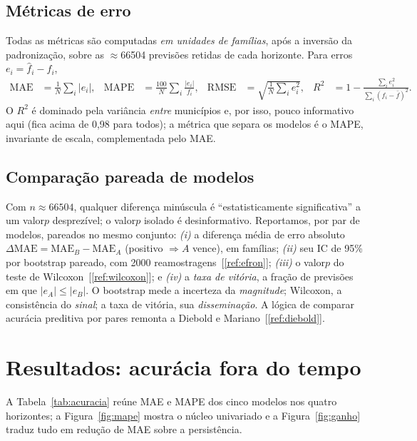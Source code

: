 \documentclass[12pt,a4paper,oneside]{article}
\newcommand{\C}[1]{[\ref{#1}]}
\begin{document}
\subsection{Métricas de erro}

Todas as métricas são computadas \emph{em unidades de famílias}, após a
inversão da padronização, sobre as $\approx$\num{66504} previsões retidas de
cada horizonte. Para erros $e_i=\widehat{f}_i-f_i$,
\begin{align}
\mathrm{MAE}  &= \frac{1}{N}\sum_{i}\lvert e_i\rvert, &
\mathrm{MAPE} &= \frac{100}{N}\sum_{i}\frac{\lvert e_i\rvert}{f_i}, &
\mathrm{RMSE} &= \sqrt{\frac{1}{N}\sum_{i}e_i^2}, &
R^2 &= 1-\frac{\sum_i e_i^2}{\sum_i (f_i-\bar f)^2}.
\end{align}
O $R^2$ é dominado pela variância \emph{entre} municípios e, por isso,
pouco informativo aqui (fica acima de 0,98 para todos); a métrica que
separa os modelos é o MAPE, invariante de escala, complementada pelo MAE.

\subsection{Comparação pareada de modelos}

Com $n\approx\num{66504}$, qualquer diferença minúscula é
``estatisticamente significativa'' a um valor\-$p$ desprezível; o
valor\-$p$ isolado é desinformativo. Reportamos, por par de modelos,
pareados no mesmo conjunto: \emph{(i)} a diferença média de erro absoluto
$\Delta\mathrm{MAE}=\mathrm{MAE}_B-\mathrm{MAE}_A$ (positivo $\Rightarrow A$
vence), em famílias; \emph{(ii)} seu IC de 95\% por bootstrap pareado, com
\num{2000} reamostragens~\C{ref:efron}; \emph{(iii)} o valor\-$p$ do teste
de Wilcoxon~\C{ref:wilcoxon}; e \emph{(iv)} a \emph{taxa de vitória}, a
fração de previsões em que $\lvert e_A\rvert\le\lvert e_B\rvert$. O
bootstrap mede a incerteza da \emph{magnitude}; Wilcoxon, a consistência do
\emph{sinal}; a taxa de vitória, sua \emph{disseminação}. A lógica de
comparar acurácia preditiva por pares remonta a Diebold e
Mariano~\C{ref:diebold}.

\section{Resultados: acurácia fora do tempo}
\label{sec:resultados}

A Tabela~\ref{tab:acuracia} reúne MAE e MAPE dos cinco modelos nos quatro
horizontes; a Figura~\ref{fig:mape} mostra o núcleo univariado e a
Figura~\ref{fig:ganho} traduz tudo em redução de MAE sobre a persistência.
\end{document}
